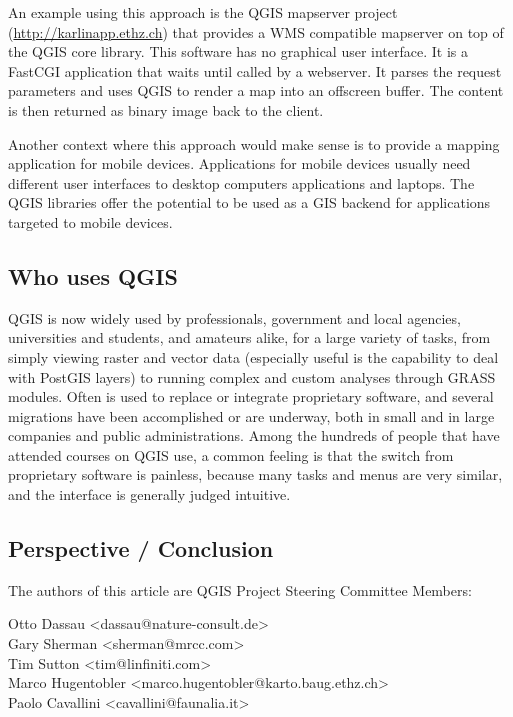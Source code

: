 An example using this approach is the QGIS mapserver project (\url{http://karlinapp.ethz.ch}) that provides a WMS
compatible mapserver on top of the QGIS core library. This software has no 
graphical user interface. It is a FastCGI application that waits until called
by a webserver. It parses the request parameters and uses QGIS to render a map
into an offscreen buffer. The content is then returned as binary image back to
the client.

Another context where this approach would make sense is to provide a mapping
application for mobile devices. Applications for mobile devices usually need
different user interfaces to desktop computers applications and
laptops. The QGIS libraries offer the potential to be used as a GIS backend for 
applications targeted to mobile devices.

\subsection{Who uses QGIS}
QGIS is now widely used by professionals, government and local agencies, universities and students, and amateurs alike, for a large variety of tasks, from simply viewing raster and vector data (especially useful is the capability to deal with PostGIS layers) to running complex and custom analyses through GRASS modules. Often is used to replace or integrate proprietary software, and several migrations have been accomplished or are underway, both in small and in large companies and public administrations. Among the hundreds of people that have attended courses on QGIS use, a common feeling is that the switch from proprietary software is painless, because many tasks and menus are very similar, and the interface is generally judged intuitive.

\subsection{Perspective / Conclusion}


The authors of this article are QGIS Project Steering Committee Members:

Otto Dassau <dassau@nature-consult.de>  
\\Gary Sherman <sherman@mrcc.com>
\\Tim Sutton <tim@linfiniti.com>
\\Marco Hugentobler <marco.hugentobler@karto.baug.ethz.ch>
\\Paolo Cavallini <cavallini@faunalia.it>

